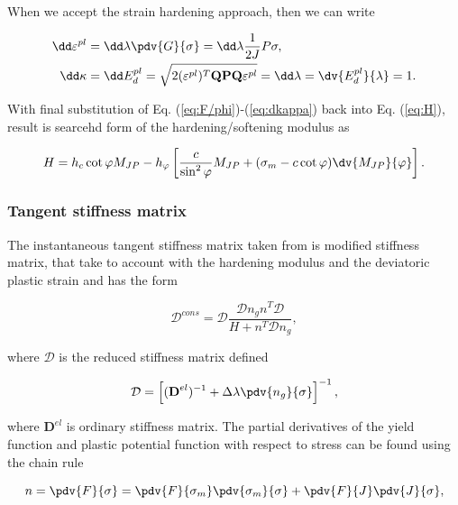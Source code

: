 When we accept the strain hardening approach, then we can write

\begin{align}
	\dd\varepsilon^{pl}& = \dd\lambda\pdv{G}{\sigma} = \dd\lambda\dfrac{1}{2J}P\sigma,\\
	\dd\kappa& = \dd E_d^{pl} = \sqrt{2(\varepsilon^{pl})^T \text{\textbf{QPQ}} \varepsilon^{pl} } = \dd \lambda = \dv{E_d^{pl}}{\lambda} = 1.\label{eq:dkappa}
\end{align}

With final substitution of Eq. (\ref{eq:F/phi})-(\ref{eq:dkappa}) back into Eq. (\ref{eq:H}), result is searcehd form of the hardening/softening modulus as

\begin{equation}\label{eq:H_final}
	H = h_c \cot\varphi M_{JP} - h_\varphi \left[ \dfrac{c}{\sin^2 \varphi} M_{JP} + (\sigma_m - c \cot \varphi) \dv{M_{JP}}{\varphi} \right].
\end{equation}

\subsubsection{Tangent stiffness matrix}
\indent

The instantaneous tangent stiffness matrix taken from \cite{geofem} is modified stiffness matrix, that take to account with the hardening modulus and the deviatoric plastic strain and has the form

\begin{equation}
	\mathcal{D}^{\textit{cons}} = \mathcal{D} \dfrac{\mathcal{D} n_g n^T \mathcal{D}}{H + n^T \mathcal{D} n_g},
\end{equation}

where $\mathcal{D}$ is the reduced stiffness matrix defined 

\begin{equation}
	\mathcal{D}	= \left[  (\boldsymbol{\text{\textbf{D}}}^{el})^{-1} + \Delta \lambda \pdv{n_g}{\sigma} \right]^{-1},
\end{equation}

where $\textbf{D}^{el}$ is ordinary stiffness matrix. The partial derivatives of the yield function and plastic potential function with respect to stress can be found using the chain rule

\begin{equation}
	n = \pdv{F}{\sigma} = \pdv{F}{\sigma_m} \pdv{\sigma_m}{\sigma} + \pdv{F}{J}\pdv{J}{\sigma},
\end{equation}

